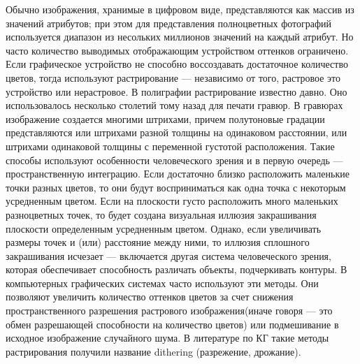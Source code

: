 \Introduction

Обычно изображения, хранимые в цифровом виде, представляются как массив из значений атрибутов; при этом для представления полноцветных фотографий используется диапазон из несольких миллионов значений на каждый атрибут. Но часто количество выводимых отображающим устройством оттенков ограничено. Если графическое устройство не способно воссоздавать достаточное количество цветов, тогда используют растрирование — независимо от того, растровое это устройство или нерастровое. В полиграфии растрирование известно давно. Оно использовалось несколько столетий тому назад для печати гравюр. В гравюрах изображение создается многими штрихами, причем полутоновые градации представляются или штрихами разной толщины на одинаковом расстоянии, или штрихами одинаковой толщины с переменной густотой расположения. Такие способы используют особенности человеческого зрения и в первую очередь — пространственную интеграцию. Если достаточно близко расположить маленькие точки разных цветов, то они будут восприниматься как одна точка с некоторым усредненным цветом. Если на плоскости густо расположить много маленьких разноцветных точек, то будет создана визуальная иллюзия закрашивания плоскости определенным усредненным цветом. Однако, если увеличивать размеры точек и (или) расстояние между ними, то иллюзия сплошного закрашивания исчезает — включается другая система человеческого зрения, которая обеспечивает способность различать объекты, подчеркивать контуры.
В компьютерных графических системах часто используют эти методы. Они позволяют увеличить количество оттенков цветов за счет снижения пространственного разрешения растрового изображения(иначе говоря — это обмен разрешающей способности на количество цветов) или подмешивание в исходное изображение случайного шума. В литературе по КГ такие методы растрирования получили название dithering (разрежение, дрожание). 

